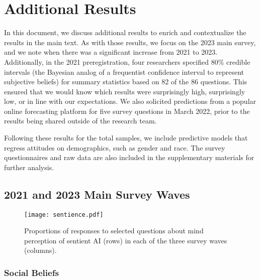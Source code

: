 \documentclass[manuscript,screen,review,nonacm]{acmart}
\begin{document}

\title{}

\authorsaddresses{}

\maketitle

\vspace{-1.45cm}

\section{Additional Results}

In this document, we discuss additional results to enrich and contextualize the results in the main text. As with those results, we focus on the 2023 main survey, and we note when there was a significant increase from 2021 to 2023. Additionally, in the 2021 preregistration, four researchers specified 80\% credible intervals (the Bayesian analog of a frequentist confidence interval to represent subjective beliefs) for summary statistics based on 82 of the 86 questions. This ensured that we would know which results were surprisingly high, surprisingly low, or in line with our expectations. We also solicited predictions from a popular online forecasting platform for five survey questions in March 2022, prior to the results being shared outside of the research team.

Following these results for the total samples, we include predictive models that regress attitudes on demographics, such as gender and race. The survey questionnaires and raw data are also included in the supplementary materials for further analysis.

\subsection{2021 and 2023 Main Survey Waves}

\begin{figure}[ht]
    \texttt{[image: sentience.pdf]}
    \caption{Proportions of responses to selected questions about mind perception of sentient AI (rows) in each of the three survey waves (columns).}
    \label{fig:sentience}
    \Description{}{}
\end{figure}

\subsubsection{Social Beliefs}
\end{document}
